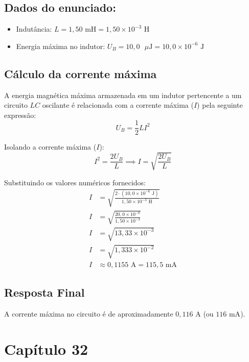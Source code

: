 \documentclass[12pt,a4paper]{article}
\begin{document}
\subsection*{Dados do enunciado:}
\begin{itemize}
    \item Indutância: $L = 1,50\text{ mH} = 1,50 \times 10^{-3}\text{ H}$
    \item Energia máxima no indutor: $U_B = 10,0\text{ }\mu\text{J} = 10,0 \times 10^{-6}\text{ J}$
\end{itemize}

\subsection*{Cálculo da corrente máxima}

A energia magnética máxima armazenada em um indutor pertencente a um circuito $LC$ oscilante é relacionada com a corrente máxima ($I$) pela seguinte expressão:
\begin{equation*}
U_B = \frac{1}{2} L I^2
\end{equation*}

Isolando a corrente máxima ($I$):
\begin{equation*}
I^2 = \frac{2 U_B}{L} \implies I = \sqrt{\frac{2 U_B}{L}}
\end{equation*}

Substituindo os valores numéricos fornecidos:
\begin{align*}
I &= \sqrt{\frac{2 \cdot (10,0 \times 10^{-6}\text{ J})}{1,50 \times 10^{-3}\text{ H}}} \\
I &= \sqrt{\frac{20,0 \times 10^{-6}}{1,50 \times 10^{-3}}} \\
I &= \sqrt{13,33 \times 10^{-3}} \\
I &= \sqrt{1,333 \times 10^{-2}} \\
I &\approx 0,1155\text{ A} = 115,5\text{ mA}
\end{align*}

\subsection*{Resposta Final}
A corrente máxima no circuito é de aproximadamente \textbf{$0,116\text{ A}$} (ou \textbf{$116\text{ mA}$}).




\section{Capítulo 32}
\end{document}
